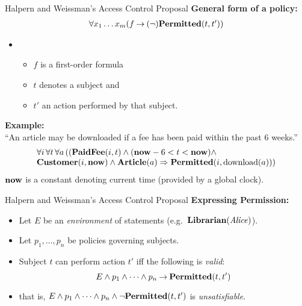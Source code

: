 \begin{wideslide}[bm=,toc=]{Halpern and Weissman's Access Control Proposal}
\textbf{General form of a policy:}
\begin{displaymath}
\begin{array}{l}
\forall x_1\ldots x_m(f \mathbin{\rightarrow} (\neg)\mbox{\bf Permitted}(t,t'))
\end{array}
\end{displaymath}
\vspace{-15mm}
\begin{itemize}
\item[] \phantom{empty bullet}
\begin{itemize}
\item $f$ is a first-order formula
\item $t$ denotes a subject and 
\item $t'$ an action performed by that subject.
\end{itemize}
\end{itemize}
\vspace{3mm}
\pause
\textbf{Example:}\\
\vspace{2mm}
``An article may be downloaded if a fee has been paid within the past 6 weeks.''
\vspace{-2mm}
\begin{displaymath}
\begin{array}{l}
\forall i\, \forall t\, \forall a\, ((\mbox{\bf PaidFee}(i,t)\wedge (\mbox{\bf now} - 6 < t < \mbox{\bf now})\wedge \\
\mbox{\bf Customer}(i,\mbox{\bf now})\wedge\mbox{\bf Article}(a) \Rightarrow \mbox{\bf Permitted}(i,\mbox{\rm download}(a)))
\end{array}
\end{displaymath}
$\mbox{\bf now}$ is a constant denoting current time (provided by a global clock).
\end{wideslide}

\begin{wideslide}[bm=,toc=]{Halpern and Weissman's Access Control Proposal}
\textbf{Expressing Permission:}
\begin{itemize}
\item<2-> Let $E$ be an {\em environment\/} of statements (e.g.\ $\mbox{\bf Librarian}(\mbox{\it Alice\/})$).
\item<3-> Let $p_1,\ldots ,p_n$ be policies governing subjects.
\item<4-> Subject $t$ can perform action $t'$ iff the following is {\em valid\/}:
\pause[4]
\begin{displaymath}
E\wedge p_1 \wedge \cdots \wedge p_n \mathbin{\rightarrow} \mbox{\bf Permitted}(t,t')
\end{displaymath}
\vspace{-5mm}
\item<6->  that is, $E\wedge p_1 \wedge \cdots \wedge p_n \wedge \neg\mbox{\bf Permitted}(t,t')$ 
is {\em unsatisfiable\/}.
\end{itemize}
\end{wideslide}

